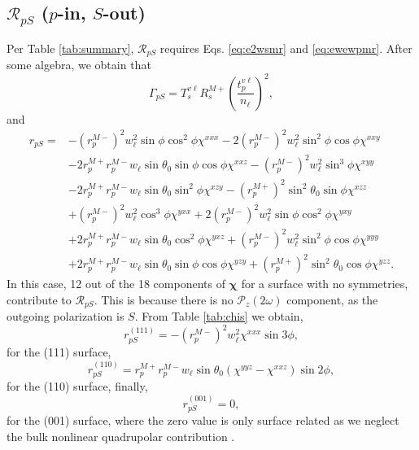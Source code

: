 \subsection{\texorpdfstring{$\mathcal{R}_{pS}$ ($p$-in, $S$-out)}
{RpS (p-in, S-out)}}
\label{sec:RpS}

Per Table \ref{tab:summary}, $\mathcal{R}_{pS}$ requires Eqs. \eqref{eq:e2wsmr}
and \eqref{eq:ewewpmr}. After some algebra, we obtain that
\begin{equation}\label{mcv}
\Gamma_{pS} =
T_{s}^{v\ell}R^{M+}_{s}
\left(\frac{t^{v\ell}_{p}}{n_{\ell}}\right)^{2},
\end{equation}
and
\begin{equation}
\begin{split}
r_{pS}=
&- \left(r^{M-}_{p}\right)^{2}w^{2}_{\ell}\sin\phi\cos^{2}\phi\chi^{xxx}
 - 2\left(r^{M-}_{p}\right)^{2}w^{2}_{\ell}\sin^{2}\phi\cos\phi\chi^{xxy}\\
&- 2r^{M+}_{p}r^{M-}_{p}w_{\ell}\sin\theta_{0}\sin\phi\cos\phi\chi^{xxz}
 - \left(r^{M-}_{p}\right)^{2}w^{2}_{\ell}\sin^{3}\phi\chi^{xyy}\\
&- 2r^{M+}_{p}r^{M-}_{p}w_{\ell}\sin\theta_{0}\sin^{2}\phi\chi^{xzy}
 - \left(r^{M+}_{p}\right)^{2}\sin^{2}\theta_{0}\sin\phi\chi^{xzz}\\
&+ \left(r^{M-}_{p}\right)^{2}w^{2}_{\ell}\cos^{3}\phi\chi^{yxx}
 + 2\left(r^{M-}_{p}\right)^{2}w^{2}_{\ell}\sin\phi\cos^{2}\phi\chi^{yxy}\\
&+ 2r^{M+}_{p}r^{M-}_{p}w_{\ell}\sin\theta_{0}\cos^{2}\phi\chi^{yxz}
 + \left(r^{M-}_{p}\right)^{2}w^{2}_{\ell}\sin^{2}\phi\cos\phi\chi^{yyy}\\
&+ 2r^{M+}_{p}r^{M-}_{p}w_{\ell}\sin\theta_{0}\sin\phi\cos\phi\chi^{yzy}
 + \left(r^{M+}_{p}\right)^{2}\sin^{2}\theta_{0}\cos\phi\chi^{yzz}.
\end{split}
\end{equation}
In this case, 12 out of the 18 components of $\boldsymbol{\chi}$ for a surface
with no symmetries, contribute to $\mathcal{R}_{pS}$. This is because there is
no $\mathcal{P}_{z}(2\omega)$ component, as the outgoing polarization is $S$.
From Table \ref{tab:chis} we obtain,
\begin{equation}\label{eq:rps111}
r^{(111)}_{pS} = - \left(r^{M-}_{p}\right)^{2}w^{2}_{\ell}\chi^{xxx}\sin3\phi,
\end{equation}
for the (111) surface,
\begin{equation}\label{eq:rps110}
r^{(110)}_{pS} =
r^{M+}_{p}r^{M-}_{p}w_{\ell}\sin\theta_{0}(\chi^{yyz} - \chi^{xxz})\sin2\phi,
\end{equation}
for the (110) surface, 
finally,
\begin{equation}\label{eq:rps001}
r^{(001)}_{pS} = 0,
\end{equation}
for the (001) surface, where the zero value is only surface related as we
neglect the bulk nonlinear quadrupolar contribution \cite{sipePRB87}.


